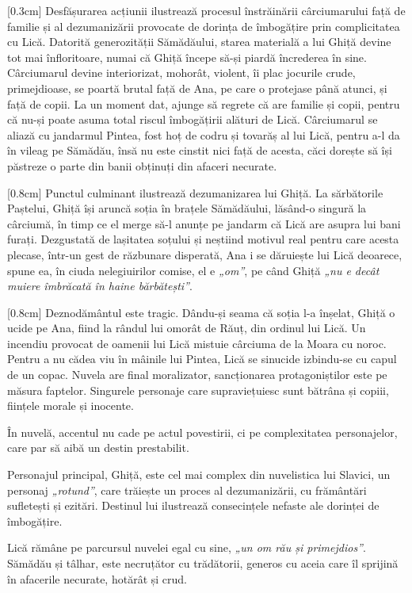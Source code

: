 \documentclass[
12pt,
a4paper
]{article}
\begin{document}
[0.3cm]
Desfășurarea acțiunii ilustrează procesul înstrăinării cârciumarului față de familie și al dezumanizării provocate de dorința de îmbogățire prin complicitatea cu Lică. Datorită generozității Sămădăului, starea materială a lui Ghiță devine tot mai înfloritoare, numai că Ghiță începe să-și piardă încrederea în sine. Cârciumarul devine interiorizat, mohorât, violent, îi plac jocurile crude, primejdioase, se poartă brutal față de Ana, pe care o protejase până atunci, și față de copii. La un moment dat, ajunge să regrete că are familie și copii, pentru că nu-și poate asuma total riscul îmbogățirii alături de Lică. Cârciumarul se aliază cu jandarmul Pintea, fost hoț de codru și tovarăș al lui Lică, pentru a-l da în vileag pe Sămădău, însă nu este cinstit nici față de acesta, căci dorește să își păstreze o parte din banii obținuți din afaceri necurate.

[0.8cm]
Punctul culminant ilustrează dezumanizarea lui Ghiță. La sărbătorile Paștelui, Ghiță își aruncă soția în brațele Sămădăului, lăsând-o singură la cârciumă, în timp ce el merge să-l anunțe pe jandarm că Lică are asupra lui bani furați. Dezgustată de lașitatea soțului și neștiind motivul real pentru care acesta plecase, într-un gest de răzbunare disperată, Ana i se dăruiește lui Lică deoarece, spune ea, în ciuda nelegiuirilor comise, el e \textit{„om”}, pe când Ghiță \textit{„nu e decât muiere îmbrăcată în haine bărbătești”}.

[0.8cm]
Deznodământul este tragic. Dându-și seama că soția l-a înșelat, Ghiță o ucide pe Ana, fiind la rândul lui omorât de Răuț, din ordinul lui Lică. Un incendiu provocat de oamenii lui Lică mistuie cârciuma de la Moara cu noroc. Pentru a nu cădea viu în mâinile lui Pintea, Lică se sinucide izbindu-se cu capul de un copac. Nuvela are final moralizator, sancționarea protagoniștilor este pe măsura faptelor. Singurele personaje care supraviețuiesc sunt bătrâna și copiii, ființele morale și inocente.

În nuvelă, accentul nu cade pe actul povestirii, ci pe complexitatea personajelor, care par să aibă un destin prestabilit.

Personajul principal, Ghiță, este cel mai complex din nuvelistica lui Slavici, un personaj \textit{„rotund”}, care trăiește un proces al dezumanizării, cu frământări sufletești și ezitări. Destinul lui ilustrează consecințele nefaste ale dorinței de îmbogățire.

Lică rămâne pe parcursul nuvelei egal cu sine, \textit{„un om rău și primejdios”}. Sămădău și tâlhar, este necruțător cu trădătorii, generos cu aceia care îl sprijină în afacerile necurate, hotărât și crud.
\end{document}
